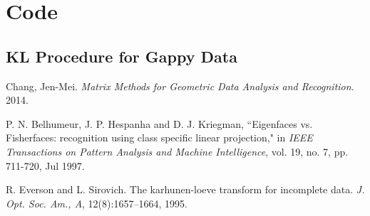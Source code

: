 \appendix

\section{Code}\label{code}

\subsection{KL Procedure for Gappy Data}




\begin{thebibliography}{10}
    Chang, Jen-Mei. \textit{Matrix Methods for Geometric Data Analysis and Recognition}. 2014.

    P. N. Belhumeur, J. P. Hespanha and D. J. Kriegman, ``Eigenfaces vs. Fisherfaces: recognition using class specific linear projection," in \textit{IEEE Transactions on Pattern Analysis and Machine Intelligence}, vol. 19, no. 7, pp. 711-720, Jul 1997.

    R. Everson and L. Sirovich. The karhunen-loeve transform for incomplete data. \textit{J. Opt. Soc. Am., A}, 12(8):1657–1664, 1995.
\end{thebibliography}


